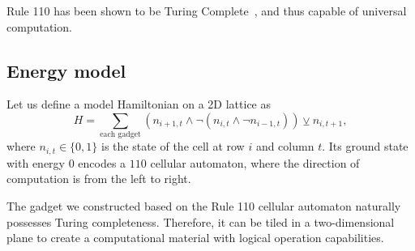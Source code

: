 \documentclass[twocolumn,superscriptaddress,english,showpacs,longbibliography]{revtex4-2}
\begin{document}
Rule 110 has been shown to be Turing Complete~\cite{Cook2009}, and thus capable of universal
computation.

\subsection{Energy model}\label{a-2d-surface-programmable-material}

Let us define a model Hamiltonian on a 2D lattice as
\begin{equation}\label{eq:toy-hamiltonian}
H = \sum_{\text{each gadget}} (n_{i+1, t} \land \neg(n_{i, t} \land \neg n_{i-1, t})) \veebar n_{i,t+1},
\end{equation}
where $n_{i, t} \in \{0, 1\}$ is the state of the cell at row $i$ and column $t$.
Its ground state with energy $0$ encodes a $110$ cellular automaton, where the direction of computation is from the left to right.

The gadget we constructed based on the Rule 110 cellular automaton
naturally possesses Turing completeness. Therefore, it can be tiled in a
two-dimensional plane to create a computational material with logical
operation capabilities.

\end{document}
